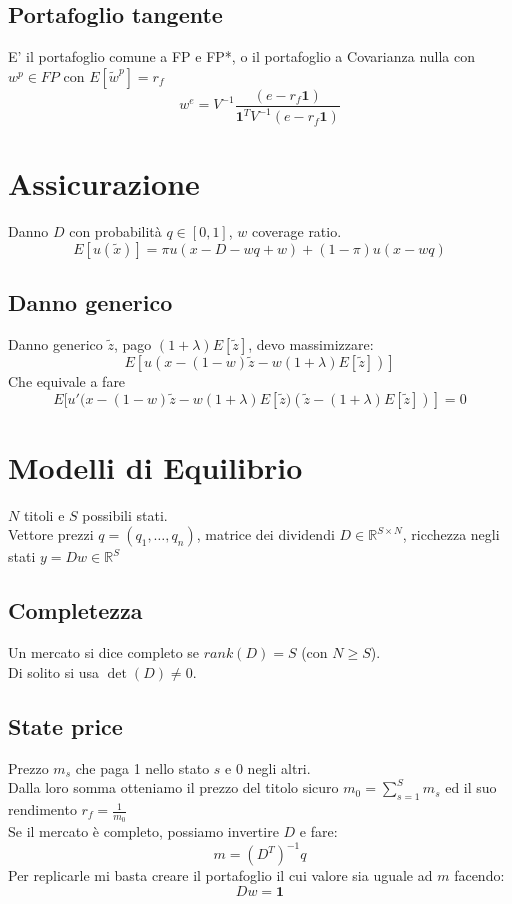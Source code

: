 \documentclass[a4paper,notitlepage]{report}%
\newcommand{\R}{\mathbb{R}}%
\begin{document}
\begin{multicols*}{2}
    \subsection*{Portafoglio tangente}
    E' il portafoglio comune a FP e FP*, o il portafoglio
    a Covarianza nulla con $w^p\in FP$ con $E[\tilde{w}^p] = r_f$
    \[
        w^e = V^{-1} \frac{(e-r_f\mathbf{1})}{\mathbf{1}^TV^{-1}(e-r_f\mathbf{1})}    
    \]



\section*{Assicurazione}

    Danno $D$ con probabilità $q\in[0,1]$, $w$ coverage ratio.
    \[
        E[u(\tilde{x})] = \pi u(x-D-wq+w) + (1-\pi) u(x-wq)   
    \]

    \subsection*{Danno generico}
    Danno generico $\tilde{z}$, pago $(1+\lambda)E[\tilde{z}]$, devo massimizzare:
    \[
        E[u( x - (1-w)\tilde{z} - w(1+\lambda)E[\tilde{z}] )]   
    \]
    Che equivale a fare
    \[
        E[ u'(x - (1-w)\tilde{z} - w(1+\lambda)E[\tilde{z} ) ( \tilde{z}-(1+\lambda) E[\tilde{z}] ) ] = 0
    \]


\section*{Modelli di Equilibrio}
    $N$ titoli e $S$ possibili stati. \\
    Vettore prezzi $q=(q_1,\dots,q_n)$,
    matrice dei dividendi $D\in\R^{S\times N}$,
    ricchezza negli stati $y=Dw\in\R^S$

    \subsection*{Completezza}
        Un mercato si dice completo se $rank(D)=S$ (con $N\geq S$).\\
        Di solito si usa $\det(D)\neq0$.

    \subsection*{State price}
    Prezzo $m_s$ che paga 1 nello stato $s$ e 0 negli altri.\\
    Dalla loro somma otteniamo il prezzo del titolo sicuro $m_0 = {\sum_{s=1}^S m_s}$
    ed il suo rendimento $r_f = \frac{1}{m_0}$\\
    Se il mercato è completo, possiamo invertire $D$ e fare:
    \[
        m=(D^T)^{-1} q   
    \]
    Per replicarle mi basta creare il portafoglio
    il cui valore sia uguale ad $m$ facendo:
    \[
        Dw=\mathbf{1}   
    \]



\end{multicols*}
\end{document}
